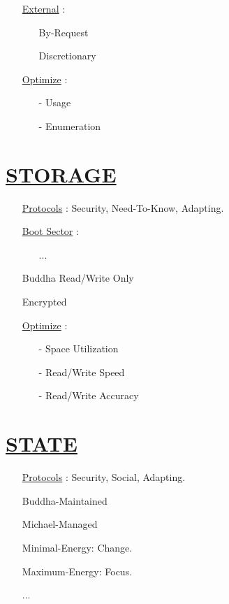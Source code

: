 \documentclass[11pt]{article}
\begin{document}
\begin{enumerate}
\begin{enumerate}
		\item[] \ul{External} :
		\begin{enumerate}
			\item[] By-Request
			\item[] Discretionary
		\end{enumerate}

		\item[] \ul{Optimize}  :
		\begin{enumerate}
			\item[-] Usage
			\item[-] Enumeration
		\end{enumerate}
	\end{enumerate}
\end{enumerate}


\section*{\ul{STORAGE}}
\begin{enumerate}
	\item[] \ul{Protocols} : Security, Need-To-Know, Adapting.
	
	\item[] \ul{Boot Sector} :
	\begin{enumerate}
		\item[] ...
	\end{enumerate}
	
	\item[] Buddha Read/Write Only
	\item[] Encrypted
	\item[] \ul{Optimize}  :
	\begin{enumerate}
		\item[-] Space Utilization
		\item[-] Read/Write Speed
		\item[-] Read/Write Accuracy
	\end{enumerate}
\end{enumerate}


\section*{\ul{STATE}}
\begin{enumerate}
	\item[] \ul{Protocols} : Security, Social, Adapting.
	
	\item[] Buddha-Maintained
	\item[] Michael-Managed
	\item[] Minimal-Energy: Change.
	\item[] Maximum-Energy: Focus.
	\item[] ...
\end{enumerate}
\end{document}
